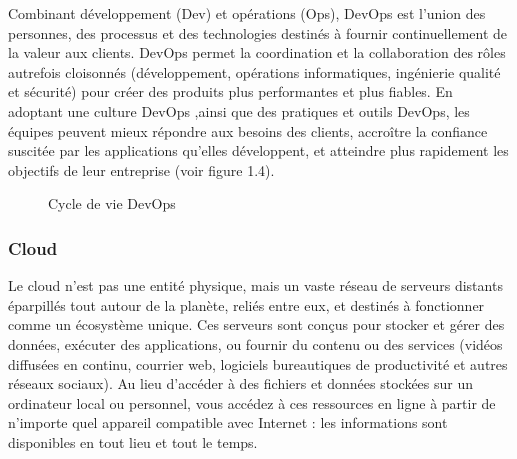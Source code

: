     Combinant développement (Dev) et opérations (Ops), DevOps est l'union des personnes, des processus et des technologies destinés à fournir continuellement de la valeur aux clients.
    DevOps permet la coordination et la collaboration des rôles autrefois cloisonnés (développement, opérations informatiques, ingénierie qualité et sécurité) pour créer des produits plus performantes et plus fiables. En adoptant une culture DevOps ,ainsi que des pratiques et outils DevOps, les équipes peuvent mieux répondre aux besoins des clients, accroître la confiance suscitée par les applications qu'elles développent, et atteindre plus rapidement les objectifs de leur entreprise \cite{1} (voir figure 1.4).
    \begin{figure}[H]
    \begin{center}

    \end{center}

    \caption{Cycle de vie DevOps}
\end{figure}
\subsubsection{\selectfont\Large  Cloud}

 Le cloud n’est pas une entité physique, mais un vaste réseau de serveurs distants éparpillés tout autour de la planète, reliés entre eux, et destinés à fonctionner comme un écosystème unique. Ces serveurs sont conçus pour stocker et gérer des données, exécuter des applications, ou fournir du contenu ou des services (vidéos diffusées en continu, courrier web, logiciels bureautiques de productivité et autres réseaux sociaux). Au lieu d’accéder à des fichiers et données stockées sur un ordinateur local ou personnel, vous accédez à ces ressources en ligne à partir de n’importe quel appareil compatible avec Internet : les informations sont disponibles en tout lieu et tout le temps.\cite{2} 
